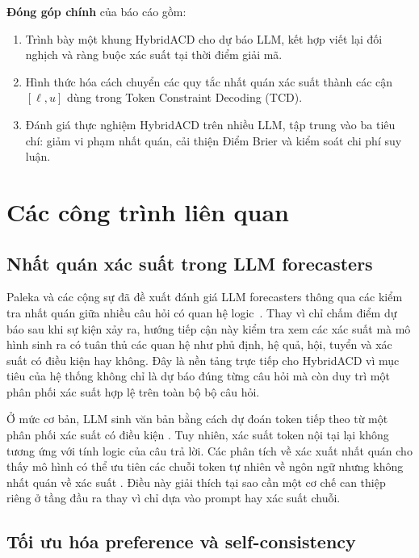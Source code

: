 \documentclass[pdflatex,sn-mathphys-num,oneside]{sn-jnl}
\begin{document}
\textbf{Đóng góp chính} của báo cáo gồm:
\begin{enumerate}
  \item Trình bày một khung HybridACD cho dự báo LLM, kết hợp viết lại đối nghịch và ràng buộc xác suất tại thời điểm giải mã.
  \item Hình thức hóa cách chuyển các quy tắc nhất quán xác suất thành các cận $[\ell,u]$ dùng trong Token Constraint Decoding (TCD).
  \item Đánh giá thực nghiệm HybridACD trên nhiều LLM, tập trung vào ba tiêu chí: giảm vi phạm nhất quán, cải thiện Điểm Brier và kiểm soát chi phí suy luận.
\end{enumerate}

\section{Các công trình liên quan}\label{sec:related}

\subsection{Nhất quán xác suất trong LLM forecasters}

Paleka và các cộng sự đã đề xuất đánh giá LLM forecasters thông qua các kiểm tra nhất quán giữa nhiều câu hỏi có quan hệ logic\ \cite{ref1}. Thay vì chỉ chấm điểm dự báo sau khi sự kiện xảy ra, hướng tiếp cận này kiểm tra xem các xác suất mà mô hình sinh ra có tuân thủ các quan hệ như phủ định, hệ quả, hội, tuyển và xác suất có điều kiện hay không. Đây là nền tảng trực tiếp cho HybridACD vì mục tiêu của hệ thống không chỉ là dự báo đúng từng câu hỏi mà còn duy trì một phân phối xác suất hợp lệ trên toàn bộ bộ câu hỏi.

Ở mức cơ bản, LLM sinh văn bản bằng cách dự đoán token tiếp theo từ một phân phối xác suất có điều kiện \cite{ref2}. Tuy nhiên, xác suất token nội tại lại không tương ứng với tính logic của câu trả lời. Các phân tích về xác xuất nhất quán cho thấy mô hình có thể ưu tiên các chuỗi token tự nhiên về ngôn ngữ nhưng không nhất quán về xác suất \cite{ref4,ref5}. Điều này giải thích tại sao cần một cơ chế can thiệp riêng ở tầng đầu ra thay vì chỉ dựa vào prompt hay xác suất chuỗi.

\subsection{Tối ưu hóa preference và self-consistency}
\end{document}
